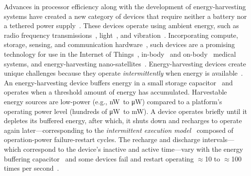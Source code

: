 Advances in processor efficiency along with the development of
energy-harvesting systems have created a new category of devices that require
neither a battery nor a tethered power
supply~\cite{prasad_comst_2014,lucia_snapl_2017,soyata_csm_2016}. These
devices operate using ambient energy, such as radio frequency
transmissions~\cite{rf_powered_computing_gollakota_2014},
light~\cite{margolies_infocom_2016,margolies_tosn_2016}, and
vibration~\cite{gorlatova_sigmetrics_2014}. Incorporating compute, storage,
sensing, and communication hardware~\cite{wisp5,moo,capybara}, such devices are a
promising technology for use in the Internet of Things~\cite{ku_cst_2016},
in-body~\cite{nadeau_naturebio_2017} and
on-body~\cite{bandodkar_electroanalysis_2015} medical systems, and
energy-harvesting nano-satellites~\cite{kicksat,capybara}.
%
Energy-harvesting devices create unique challenges because they operate {\em
intermittently} when energy is
available~\cite{hicks_isca_2017,lucia_snapl_2017}. An energy-harvesting device
buffers energy in a small storage capacitor~\cite{gorlatova_tmc_2013,gunduz_commag_2014} and operates when a
threshold amount of energy has accumulated. Harvestable energy sources are low-power (e.g., \si{\nano\watt}\ to \si{\micro\watt}) compared to a platform's operating
power level (hundreds of \si{\micro\watt}\ to \si{\milli\watt}). A device operates briefly until it depletes its buffered energy, after which, it shuts
down and recharges to operate again later---corresponding to the {\em intermittent execution model}~\cite{dino,lucia_snapl_2017} composed of
operation-power failure-restart cycles. 
The recharge and discharge intervals---which correspond to the device's inactive and active time---vary with the energy buffering capacitor~\cite{capybara}  and some devices fail and restart operating $\approx$10 to
$\approx$100 times per second~\cite{tan_infocom_2016,mementos,nvp}.
%

